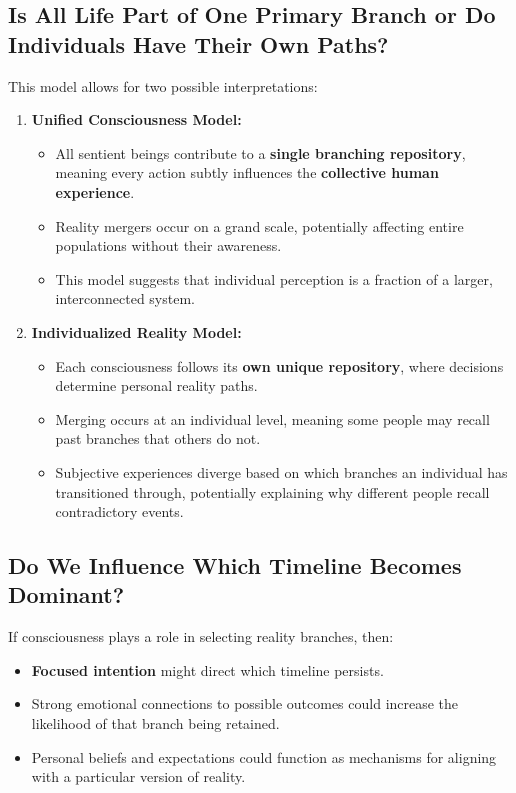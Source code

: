 \documentclass{article}
\begin{document}
\subsection{Is All Life Part of One Primary Branch or Do Individuals Have Their Own Paths?}
This model allows for two possible interpretations:
\begin{enumerate}
    \item \textbf{Unified Consciousness Model:}
    \begin{itemize}
        \item All sentient beings contribute to a \textbf{single branching repository}, meaning every action subtly influences the \textbf{collective human experience}.
        \item Reality mergers occur on a grand scale, potentially affecting entire populations without their awareness.
        \item This model suggests that individual perception is a fraction of a larger, interconnected system.
    \end{itemize}
    \item \textbf{Individualized Reality Model:}
    \begin{itemize}
        \item Each consciousness follows its \textbf{own unique repository}, where decisions determine personal reality paths.
        \item Merging occurs at an individual level, meaning some people may recall past branches that others do not.
        \item Subjective experiences diverge based on which branches an individual has transitioned through, potentially explaining why different people recall contradictory events.
    \end{itemize}
\end{enumerate}

\subsection{Do We Influence Which Timeline Becomes Dominant?}
If consciousness plays a role in selecting reality branches, then:
\begin{itemize}
    \item \textbf{Focused intention} might direct which timeline persists.
    \item Strong emotional connections to possible outcomes could increase the likelihood of that branch being retained.
    \item Personal beliefs and expectations could function as mechanisms for aligning with a particular version of reality.
\end{itemize}
\end{document}
